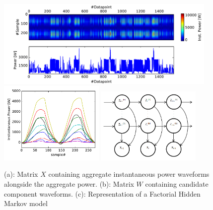 \begin{figure}[h]
\centering
\includegraphics[width=0.95\textwidth]{varbolt/matrixX_rev.pdf}\\
\includegraphics[width=0.45\textwidth]{varbolt/matrixW.pdf}
\includegraphics[width=0.45\textwidth]{varbolt/FHMM.png}
  \caption[VarBOLT: Aggregate instantaneous power waveforms and extracted candidate waveforms.]{(a): Matrix $X$ containing aggregate instantaneous power waveforms alongside the aggregate power. (b): Matrix $W$ containing candidate component waveforms. (c): Representation of a Factorial Hidden Markov model}
  \label{figure1_vb}
\end{figure}

